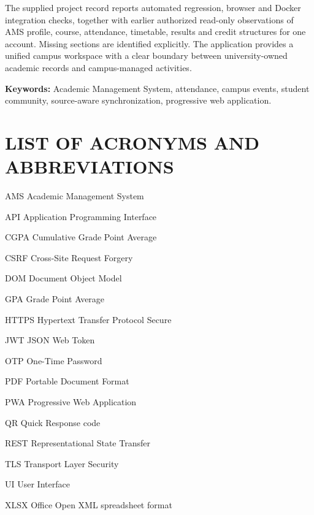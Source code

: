 \documentclass[10pt]{report}
\begin{document}
The supplied project record reports automated regression, browser and Docker integration checks, together with earlier authorized read-only observations of AMS profile, course, attendance, timetable, results and credit structures for one account. Missing sections are identified explicitly. The application provides a unified campus workspace with a clear boundary between university-owned academic records and campus-managed activities.

\noindent\textbf{Keywords:} Academic Management System, attendance, campus events, student community, source-aware synchronization, progressive web application.


\newpage

\renewcommand*\listfigurename{LIST OF FIGURES}
\listoffigures
\newpage
\renewcommand{\listtablename}{LIST OF TABLES}
\listoftables

\newpage
{}
 
\chapter*{LIST OF ACRONYMS AND ABBREVIATIONS}
\begin{abbrv}
 

\item[AMS] Academic Management System
\item[API] Application Programming Interface
\item[CGPA] Cumulative Grade Point Average
\item[CSRF] Cross-Site Request Forgery
\item[DOM] Document Object Model
\item[GPA] Grade Point Average
\item[HTTPS] Hypertext Transfer Protocol Secure
\item[JWT] JSON Web Token
\item[OTP] One-Time Password
\item[PDF] Portable Document Format
\item[PWA] Progressive Web Application
\item[QR] Quick Response code
\item[REST] Representational State Transfer
\item[TLS] Transport Layer Security
\item[UI] User Interface
\item[XLSX] Office Open XML spreadsheet format

\end{abbrv}
\newpage
\renewcommand\contentsname{TABLE OF CONTENTS}
\tableofcontents
{}
\thispagestyle{empty}
\end{document}
